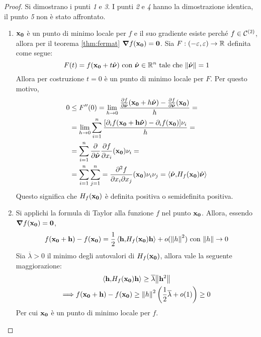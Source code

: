 \begin{proof}
    Si dimostrano i punti \textit{1} e \textit{3}. I punti \textit{2} e \textit{4} hanno la dimostrazione identica, il punto \textit{5} non è stato affrontato.
    \begin{enumerate}
        \item $\vb{x_0}$ è un punto di minimo locale per $f$ e il suo gradiente esiste perché $f\in\mathcal{C}^{(2)}$, allora per il teorema \ref{thm:fermat} $\grad f(\vb{x_0}) = \vb{0}$. Sia $F:(-\varepsilon,\varepsilon)\to \mathbb{R}$ definita come segue:
        $$
            F(t)=f(\vb{x_0}+t\hat{\bm\nu})\text{ con } \hat{\bm\nu} \in \mathbb{R}^n\text{ tale che } \norm{\hat{\bm\nu}}=1
        $$
        Allora per costruzione $t=0$ è un punto di minimo locale per $F$. Per questo motivo,
        \begin{align*}
            0&\leq F''(0)=\lim_{h\to 0}\frac{\frac{\partial f}{\partial \hat{\bm\nu}}(\vb{x_0}+h\hat{\bm\nu})-\frac{\partial f}{\partial \hat{\bm\nu}}(\vb{x_0})}{h}=\\
            &=\lim_{h\to 0}\sum_{i=1}^n\frac{[\partial_i f(\vb{x_0 + h\hat{\bm\nu}})-\partial_i f(\vb{x_0})]\nu_i}{h}=\\
            &=\sum_{i=1}^{n}\frac{\partial}{\partial \hat{\bm\nu}}\frac{\partial f}{\partial x_i}(\vb{x_0})\nu_i=\\
            &=\sum_{i=1}^n\sum_{j=1}^{n}=\frac{\partial^2 f}{\partial x_i \partial x_j}(\vb{x_0})\nu_i\nu_j=\left\langle\hat{\bm\nu}{,}H_f(\vb{x_0})\hat{\bm\nu}\right\rangle
        \end{align*}
        Questo significa che $H_f(\vb{x_0})$ è definita positiva o semidefinita positiva.
        \addtocounter{enumi}{1}
        \item Si applichi la formula di Taylor alla funzione $f$ nel punto $\vb{x_0}$. Allora, essendo $\grad f(\vb{x_0})=\vb{0}$,
        $$
            f(\vb{x_0}+\vb{h})-f(\vb{x_0}) = \frac{1}{2}\left\langle\vb{h}{,}H_f(\vb{x_0})\vb{h}\right\rangle+o(\norm{h}^2) \text{ con } \norm{h}\to 0
        $$
        Sia $\overline{\lambda}>0$ il minimo degli autovalori di $H_f(\vb{x_0})$, allora vale la seguente maggiorazione:
        \begin{gather*} 
            \left\langle\vb{h}{,}H_f(\vb{x_0})\vb{h}\right\rangle\geq \overline{\lambda}\norm{\vb{h}^2}\\
            \Longrightarrow f(\vb{x_0}+\vb{h})-f(\vb{x_0})\geq \norm{h}^2\left(\frac{1}{2}\overline{\lambda}+o(1)\right)\geq 0
        \end{gather*}
        Per cui $\vb{x_0}$ è un punto di minimo locale per $f$.
    \end{enumerate}
\end{proof}